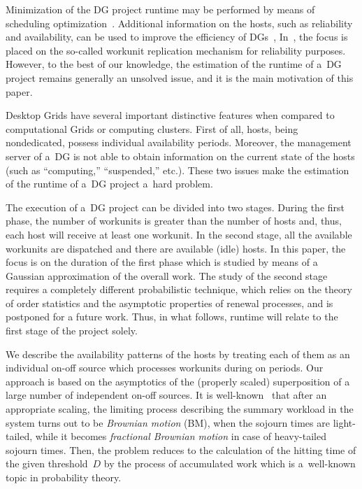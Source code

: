\begin{multicols}{2}
Minimization of the DG project runtime may be performed by means of 
scheduling optimization~\cite{6-luk-1, 7-luk-1, 8-luk-1}. Additional information on the hosts, 
such as reliability and availability, can be used to improve the efficiency of
 DGs~\cite{9-luk-1, 10-luk-1}, In~\cite{11-luk-1, 12-luk-1}, the focus is placed on the so-called 
 workunit replication mechanism for reliability purposes. However,  to the 
 best of our knowledge, the estimation of the runtime of a~DG project remains
  generally an unsolved issue, and it is the main motivation of this paper.

Desktop Grids have several important distinctive  features 
when compared to computational Grids or computing clusters. First of all, 
hosts, being nondedicated, possess individual availability periods. Moreover, 
the management server of a~DG is not able to obtain information on the current 
state of the hosts (such as ``computing,'' ``suspended,'' etc.). 
These two issues  make the estimation of the runtime of a~DG project a~hard problem. 

The execution of a~DG project can be divided into two stages. 
During the first phase, the number of work\-units is greater than the number of 
hosts and, thus,  each host will receive at least one workunit. 
In the second stage, all the available workunits are dispatched and
 there are available (idle) hosts. In this paper, the focus is on the duration of  
 the first phase  which is studied by means of a Gaussian approximation of the 
 overall work.  The   study of the second stage requires a completely different 
 probabilistic technique, which relies on  the theory of order statistics and the 
 asymptotic properties of renewal processes, and is postponed for a future work.
Thus, in what follows, runtime will relate to the first stage of the project solely.


We describe the availability patterns of the hosts by treating each of them as an 
individual on-off source which processes workunits during on periods.  
Our approach  is based on the asymptotics of the (properly scaled) superposition 
of a large number of independent on-off sources. It is well-known~\cite{4-luk-1} that 
after an appropriate scaling, the limiting process describing the summary workload 
in the system turns out to be \textit{Brownian motion} (BM), when the sojourn times 
are light-tailed, while it becomes \textit{fractional Brownian motion} 
in case of heavy-tailed sojourn times.  
Then, the problem reduces to the calculation of the hitting time of the given
 threshold~$D$ by the process of accumulated work which is a~well-known topic 
 in probability theory.


\end{multicols}
